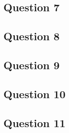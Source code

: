 \documentclass{article}
\begin{document}
\subsection*{Question 7}
\subsection*{Question 8}
\subsection*{Question 9}
\subsection*{Question 10}
\subsection*{Question 11}
\end{document}
